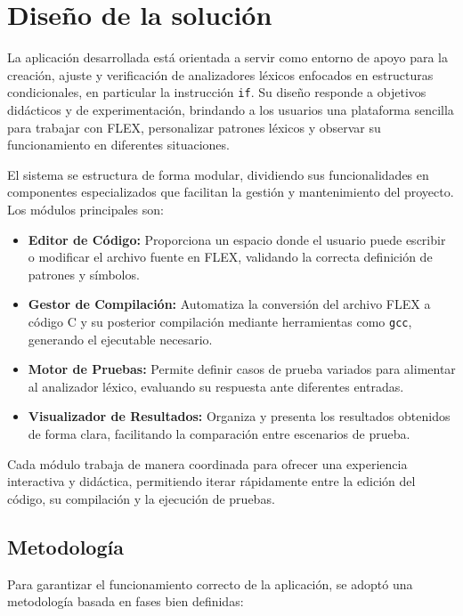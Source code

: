 \documentclass{article}
\begin{document}
\section{Diseño de la solución}\label{sec:dis}

La aplicación desarrollada está orientada a servir como entorno de apoyo para la creación, ajuste y verificación de analizadores léxicos enfocados en estructuras condicionales, en particular la instrucción \texttt{if}. Su diseño responde a objetivos didácticos y de experimentación, brindando a los usuarios una plataforma sencilla para trabajar con FLEX, personalizar patrones léxicos y observar su funcionamiento en diferentes situaciones.

El sistema se estructura de forma modular, dividiendo sus funcionalidades en componentes especializados que facilitan la gestión y mantenimiento del proyecto. Los módulos principales son:

\begin{itemize}
    \item \textbf{Editor de Código:} Proporciona un espacio donde el usuario puede escribir o modificar el archivo fuente en FLEX, validando la correcta definición de patrones y símbolos.
    \item \textbf{Gestor de Compilación:} Automatiza la conversión del archivo FLEX a código C y su posterior compilación mediante herramientas como \texttt{gcc}, generando el ejecutable necesario.
    \item \textbf{Motor de Pruebas:} Permite definir casos de prueba variados para alimentar al analizador léxico, evaluando su respuesta ante diferentes entradas.
    \item \textbf{Visualizador de Resultados:} Organiza y presenta los resultados obtenidos de forma clara, facilitando la comparación entre escenarios de prueba.
\end{itemize}

Cada módulo trabaja de manera coordinada para ofrecer una experiencia interactiva y didáctica, permitiendo iterar rápidamente entre la edición del código, su compilación y la ejecución de pruebas.

\subsection{Metodología}

Para garantizar el funcionamiento correcto de la aplicación, se adoptó una metodología basada en fases bien definidas:
\end{document}
